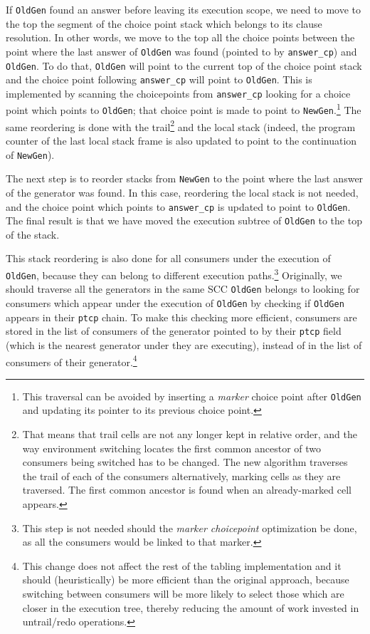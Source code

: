 \documentclass{./tlp}
\begin{document}
If \lstinline{OldGen} found an answer before leaving its execution
scope, we need to move to the top the segment of the choice point
stack which belongs to its clause resolution. In other words, we move
to the top all the choice points between the point where the last answer
of \lstinline{OldGen} was found (pointed to by \lstinline{answer_cp}) and
\lstinline{OldGen}. To do that, \lstinline{OldGen} will point to the
current top of the choice point stack and the choice point following 
\lstinline{answer_cp} will point to \lstinline{OldGen}.
This is implemented by scanning the choicepoints from
\lstinline{answer_cp} looking for a choice point which points to
\lstinline{OldGen}; that choice point is made to point to
\lstinline{NewGen}.\footnote{This traversal can be avoided by
  inserting a \emph{marker} choice point after \lstinline{OldGen} and
  updating its pointer to its previous choice point.}  The same
reordering is done with the trail\footnote{That means that trail cells
  are not any longer kept in relative order, and the way environment
  switching locates the first common ancestor of two consumers being
  switched has to be changed.  The new algorithm traverses the trail
  of each of the consumers alternatively, marking cells as they are
  traversed.  The first common ancestor is found when an
  already-marked cell appears.} and the local stack (indeed, the
program counter of the last local stack frame is also updated to point
to the continuation of \lstinline{NewGen}).


The next step is to reorder stacks from \lstinline{NewGen} to the
point where the last answer of the generator was found.  In this case,
reordering the local stack is not needed, and  the choice point
which points to \lstinline{answer_cp} is updated to point to
\lstinline{OldGen}.  The final result is that we have moved the
execution subtree of \lstinline{OldGen} to the top of the stack.

This stack reordering is also done for all consumers under the
execution of \lstinline{OldGen}, because they can belong to different
execution paths.\footnote{This step is not needed should the
  \emph{marker choicepoint} optimization be done, as all the consumers
  would be linked to that marker.}  Originally, we should traverse all
the generators in the same SCC \lstinline{OldGen} belongs to looking
for consumers which appear under the execution of \lstinline{OldGen}
by checking if \lstinline{OldGen} appears in their \lstinline{ptcp}
chain.  To make this checking more efficient, consumers are stored in the
list of consumers of the generator pointed to by their
\lstinline{ptcp} field (which is the nearest generator under they are
executing), instead of in the list of consumers of their
generator.\footnote{This change does not affect the rest of the
  tabling implementation and it should (heuristically) be more
  efficient than the original approach, because switching between
  consumers will be more likely to select those which are closer in
  the execution tree, thereby reducing the amount of work invested in
  untrail/redo operations.}
\end{document}

